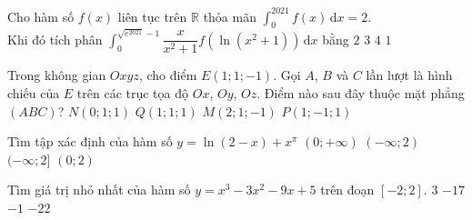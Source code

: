 \begin{ex}%
	Cho hàm số $f(x)$ liên tục trên $\mathbb{R}$ thỏa mãn $\displaystyle\int_{0}^{2021} f(x)\mathrm{\,d}x=2$.\\
	Khi đó tích phân $\displaystyle\int_{0}^{\sqrt{e^{2021}}-1}\dfrac{x}{x^{2}+1} f\left(\ln\left(x^{2}+1\right)\right)\mathrm{\,d}x$ bằng
	\choice
	{$2$}
	{$3$}
	{$4$}
	{\True $1$}
\end{ex}

\begin{ex}%
	Trong không gian $Oxyz$, cho điểm $E(1; 1;-1)$. Gọi $A$, $B$ và $C$ lần lượt là hình chiếu của $E$ trên các trục tọa độ $Ox$, $Oy$, $Oz$. Điểm nào sau đây thuộc mặt phẳng $(ABC)$?
	\choice
	{$N(0; 1; 1)$}
	{\True $Q(1; 1; 1)$}
	{$M(2; 1;-1)$}
	{$P(1;-1; 1)$}
\end{ex}


\begin{ex}%
	Tìm tập xác định của hàm số $y=\ln(2-x)+{x}^{\pi}$
	\choice 
	{$(0;+\infty)$}
	{$(-\infty;2)$}
	{$(-\infty;2]$}
	{\True $(0;2)$}
\end{ex} 

\begin{ex}%
	Tìm giá trị nhỏ nhất của hàm số $y=x^3-3x^2-9x+5$ trên đoạn $[-2;2]$.
	\choice 
	{$3$}
	{\True $-17$}
	{$-1$}
	{$-22$}
\end{ex} 

